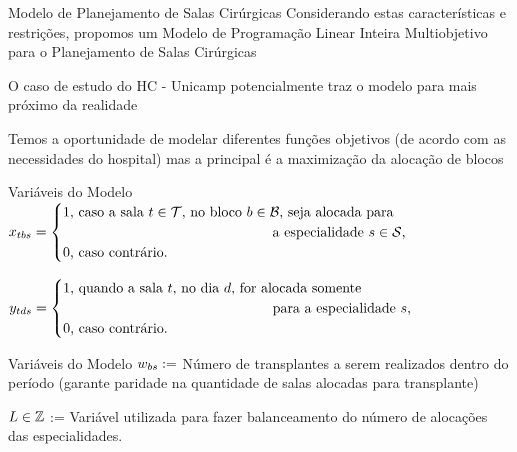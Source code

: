 \documentclass[10pt]{beamer}
\newcommand{\ca}[1]{\textcolor{cr}{#1}}
\begin{document}
\begin{frame}{Modelo de Planejamento de Salas Cirúrgicas}
    Considerando estas características e restrições, propomos um \ca{Modelo de Programação Linear Inteira Multiobjetivo para o Planejamento de Salas Cirúrgicas}
    \vspace{2em}

    O caso de estudo do HC - Unicamp potencialmente traz o modelo para mais próximo da realidade
    \vspace{2em}

    Temos a oportunidade de modelar diferentes funções objetivos (de acordo com as necessidades do hospital) mas a principal é a \ca{maximização da alocação de blocos}
\end{frame}

\begin{frame}{Variáveis do Modelo}
    $\blockvar = \begin{cases}
        1\text{, caso a sala $\roomidx \in \roomset$, no bloco $\blockidx \in \blockset$, seja alocada para} \\
        \hspace{15em}\text{a especialidade $\specialtyidx \in \specialtyset$,} \\
        0\text{, caso contrário.}
    \end{cases}$
    \vspace{2em}

    $\precvar = \begin{cases}
        1\text{, quando a sala $\roomidx$, no dia $\planninghorizonidx$, for alocada somente} \\
        \hspace{15em}\text{para a especialidade $\specialtyidx$,} \\
        0\text{, caso contrário.}
    \end{cases}$
\end{frame}


\begin{frame}{Variáveis do Modelo}
    $w_{bs} := $ Número de transplantes a serem realizados dentro do período (garante paridade na quantidade de salas alocadas para transplante)
    \vspace{2em}

    $L \in \mathbb{Z}$ := Variável utilizada para fazer balanceamento do número de alocações das especialidades. 
\end{frame}
\end{document}
